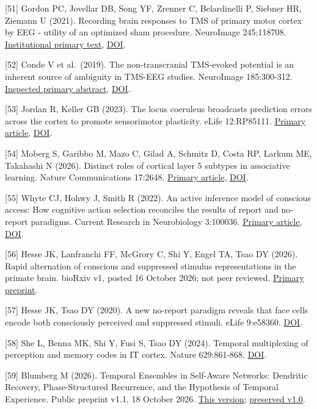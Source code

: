 \documentclass[
  american,
  11pt,
  letterpaper,
]{article}
\begin{document}
{[}51{]} Gordon PC, Jovellar DB, Song YF, Zrenner C, Belardinelli P, Siebner HR, Ziemann U (2021). Recording brain responses to TMS of primary motor cortex by EEG - utility of an optimized sham procedure. NeuroImage 245:118708. \href{https://iris.unitn.it/retrieve/handle/11572/325772/512900/Gordon_NI_2021.pdf}{Institutional primary text}, \href{https://doi.org/10.1016/j.neuroimage.2021.118708}{DOI}.

{[}52{]} Conde V et al.~(2019). The non-transcranial TMS-evoked potential is an inherent source of ambiguity in TMS-EEG studies. NeuroImage 185:300-312. \href{https://pubmed.ncbi.nlm.nih.gov/30347282/}{Inspected primary abstract}, \href{https://doi.org/10.1016/j.neuroimage.2018.10.052}{DOI}.

{[}53{]} Jordan R, Keller GB (2023). The locus coeruleus broadcasts prediction errors across the cortex to promote sensorimotor plasticity. eLife 12:RP85111. \href{https://pmc.ncbi.nlm.nih.gov/articles/PMC10328511/}{Primary article}, \href{https://doi.org/10.7554/eLife.85111}{DOI}.

{[}54{]} Moberg S, Garibbo M, Mazo C, Gilad A, Schmitz D, Costa RP, Larkum ME, Takahashi N (2026). Distinct roles of cortical layer 5 subtypes in associative learning. Nature Communications 17:2648. \href{https://pmc.ncbi.nlm.nih.gov/articles/PMC13004866/}{Primary article}, \href{https://doi.org/10.1038/s41467-026-68307-5}{DOI}.

{[}55{]} Whyte CJ, Hohwy J, Smith R (2022). An active inference model of conscious access: How cognitive action selection reconciles the results of report and no-report paradigms. Current Research in Neurobiology 3:100036. \href{https://pmc.ncbi.nlm.nih.gov/articles/PMC9593308/}{Primary article}, \href{https://doi.org/10.1016/j.crneur.2022.100036}{DOI}.

{[}56{]} Hesse JK, Lanfranchi FF, McGrory C, Shi Y, Engel TA, Tsao DY (2026). Rapid alternation of conscious and suppressed stimulus representations in the primate brain. bioRxiv v1, posted 16 October 2026; not peer reviewed. \href{https://doi.org/10.64898/2026.10.15.759299}{Primary preprint}.

{[}57{]} Hesse JK, Tsao DY (2020). A new no-report paradigm reveals that face cells encode both consciously perceived and suppressed stimuli. eLife 9:e58360. \href{https://doi.org/10.7554/eLife.58360}{DOI}.

{[}58{]} She L, Benna MK, Shi Y, Fusi S, Tsao DY (2024). Temporal multiplexing of perception and memory codes in IT cortex. Nature 629:861-868. \href{https://doi.org/10.1038/s41586-024-07349-5}{DOI}.

{[}59{]} Blumberg M (2026). Temporal Ensembles in Self-Aware Networks: Dendritic Recovery, Phase-Structured Recurrence, and the Hypothesis of Temporal Experience. Public preprint v1.1, 18 October 2026. \href{https://doi.org/10.5281/zenodo.23455800}{This version}; \href{https://doi.org/10.5281/zenodo.22924518}{preserved v1.0}.

\endgroup
\end{document}
